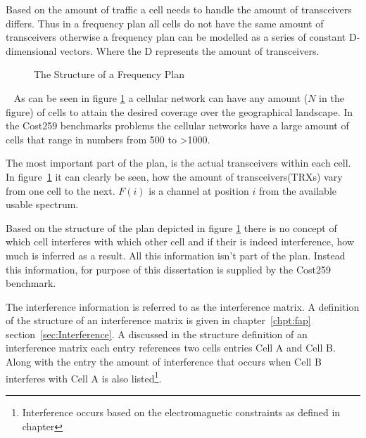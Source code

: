 Based on the amount of traffic a cell needs to handle the amount of transceivers differs. Thus in a frequency plan all cells do not have the same amount of transceivers otherwise a frequency plan can be modelled as a series of constant D-dimensional vectors. Where the D represents the amount of transceivers. 
~
\begin{figure}[ht]
	\centering
	\setlength \fboxsep{0pt}
	\setlength \fboxrule{0.5pt}
	\caption{The Structure of a Frequency Plan}
	\label{fig:fapPlan}
\end{figure}
~
As can be seen in figure \ref{fig:fapPlan} a cellular network can have any amount ($N$ in the figure) of cells to attain the desired coverage over the geographical landscape. In the Cost259 benchmarks problems the cellular networks have a large amount of cells that range in numbers from 500 to >1000. 

The most important part of the plan, is the actual transceivers within each cell. In figure~\ref{fig:fapPlan} it can clearly be seen, how the amount of transceivers(TRXs) vary from one cell to the next. $F(i)$ is a channel at position $i$ from the available usable spectrum. 

Based on the structure of the plan depicted in figure \ref{fig:fapPlan} there is no concept of which cell interferes with which other cell and if their is indeed interference, how much is inferred as a result. All this information isn't part of the plan. Instead this information, for purpose of this dissertation is supplied by the Cost259 benchmark. 

The interference information is referred to as the interference matrix. A definition of the structure of an interference matrix is given in chapter~\ref{chpt:fap} section~\ref{sec:Interference}. A discussed in the structure definition of an interference matrix each entry references two cells entries Cell A and Cell B. Along with the entry the amount of interference that occurs when Cell B interferes with Cell A is also listed\footnote{Interference occurs based on the electromagnetic constraints as defined in chapter}.

